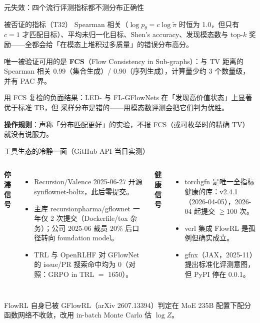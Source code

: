 \documentclass[aspectratio=169,10pt]{beamer}
\newcommand{\pos}[1]{\textcolor{positive}{#1}}
\newcommand{\con}[1]{\textcolor{negative}{#1}}
\begin{document}
\begin{frame}{元失效：四个流行评测指标都不测分布正确性}
  \begin{alertblock}{被否证的指标（T32）}
    Spearman 相关（$\log p_\theta = c\log\tilde\pi$ 时恒为 1.0，但只有 $c=1$ 才匹配目标）、平均未归一化目标、Shen's accuracy、发现模态数与 top-$k$ 奖励——全都会给「在模态上堆积过多质量」的错误分布高分。
  \end{alertblock}
  \vspace{2pt}
  唯一被验证可用的是 \textbf{FCS}（Flow Consistency in Sub-graphs）：与 TV 距离的 Spearman 相关 \pos{0.99}（集合生成）/ \pos{0.90}（序列生成），计算量少约 \pos{3 个数量级}，并有 PAC 界。

  \vspace{4pt}
  用 FCS 复检的负面结果：LED- 与 FL-GFlowNets 在「发现高价值状态」上显著优于标准 TB，但 \con{采样分布是错的}——用模态数评测会把它们判为优胜。

  \vspace{4pt}
  \textbf{操作规则}：声称「分布匹配更好」的实验，不报 FCS（或可枚举时的精确 TV）就没有说服力。
\end{frame}

\begin{frame}{工具生态的冷静一面（GitHub API 当日实测）}
  \begin{columns}[T]
      \textbf{\con{停滞信号}}
      \begin{itemize}
        \item Recursion/Valence 2025-06-27 开源 synflownet-boltz，此后零提交。
        \item 主库 recursionpharma/gflownet 一年仅 2 次提交（Dockerfile/tox 杂务）；公司 2025-06 裁员 20\% 后口径转向 foundation model。
        \item TRL 与 OpenRLHF 对 GFlowNet 的 issue/PR 搜索命中均为 0（对照：GRPO in TRL $=$ 1650）。
      \end{itemize}
      \textbf{\pos{健康信号}}
      \begin{itemize}
        \item torchgfn 是唯一全指标健康的库：v2.4.1（2026-04-05），2026-04 起提交 $\ge 100$ 次。
        \item verl 集成 FlowRL 是孤例但确实成立。
        \item gfnx（JAX，2025-11）提出标准化评测意图，但 PyPI 停在 0.0.1。
      \end{itemize}
  \end{columns}
  \vspace{4pt}
  FlowRL 自身已被 GFlowRL（arXiv 2607.13394）判定在 MoE 235B 配置下配分函数网络不收敛，改用 in-batch Monte Carlo 估 $\log Z$。
\end{frame}
\end{document}
